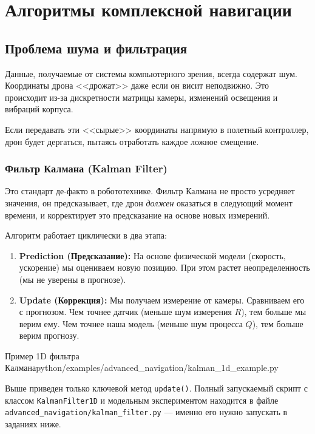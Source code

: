 \section{Алгоритмы комплексной навигации}

\subsection{Проблема шума и фильтрация}
Данные, получаемые от системы компьютерного зрения, всегда содержат шум. Координаты дрона <<дрожат>> даже если он висит неподвижно. Это происходит из-за дискретности матрицы камеры, изменений освещения и вибраций корпуса.

Если передавать эти <<сырые>> координаты напрямую в полетный контроллер, дрон будет дергаться, пытаясь отработать каждое ложное смещение.

\subsubsection{Фильтр Калмана (Kalman Filter)}
Это стандарт де-факто в робототехнике. Фильтр Калмана не просто усредняет значения, он предсказывает, где дрон \textit{должен} оказаться в следующий момент времени, и корректирует это предсказание на основе новых измерений.

Алгоритм работает циклически в два этапа:
\begin{enumerate}
    \item \textbf{Prediction (Предсказание):} На основе физической модели (скорость, ускорение) мы оцениваем новую позицию. При этом растет неопределенность (мы не уверены в прогнозе).
    \item \textbf{Update (Коррекция):} Мы получаем измерение от камеры. Сравниваем его с прогнозом. Чем точнее датчик (меньше шум измерения $R$), тем больше мы верим ему. Чем точнее наша модель (меньше шум процесса $Q$), тем больше верим прогнозу.
\end{enumerate}

\begin{codefiletitle}[python]{Пример 1D фильтра Калмана}{python/examples/advanced_navigation/kalman_1d_example.py}
\end{codefiletitle}

Выше приведен только ключевой метод \texttt{update()}. Полный запускаемый скрипт с классом \texttt{KalmanFilter1D} и модельным экспериментом находится в файле \texttt{advanced\_navigation/kalman\_filter.py} --- именно его нужно запускать в заданиях ниже.

